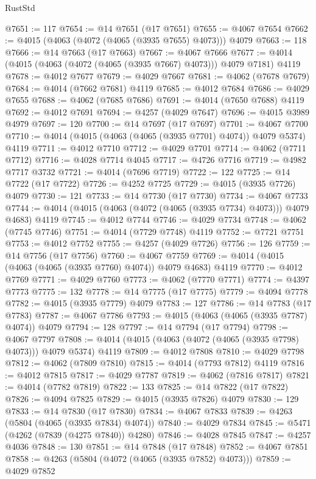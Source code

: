 \begin{lexlean}{RustStd}
\begin{coremodule}
@7651 := 117
@7654 := @14 @7651 (@17 @7651)
@7655 := @4067 @7654
@7662 := @4015 (@4063 (@4072 (@4065 (@3935 @7655) @4073))) @4079
@7663 := 118
@7666 := @14 @7663 (@17 @7663)
@7667 := @4067 @7666
@7677 := @4014 (@4015 (@4063 (@4072 (@4065 (@3935 @7667) @4073))) @4079 @7181) @4119
@7678 := @4012 @7677
@7679 := @4029 @7667
@7681 := @4062 (@7678 @7679)
@7684 := @4014 (@7662 @7681) @4119
@7685 := @4012 @7684
@7686 := @4029 @7655
@7688 := @4062 (@7685 @7686)
@7691 := @4014 (@7650 @7688) @4119
@7692 := @4012 @7691
@7694 := @4257 (@4029 @7647)
@7696 := @4015 @3989 @4979
@7697 := 120
@7700 := @14 @7697 (@17 @7697)
@7701 := @4067 @7700
@7710 := @4014 (@4015 (@4063 (@4065 (@3935 @7701) @4074)) @4079 @5374) @4119
@7711 := @4012 @7710
@7712 := @4029 @7701
@7714 := @4062 (@7711 @7712)
@7716 := @4028 @7714 @4045
@7717 := @4726 @7716
@7719 := @4982 @7717 @3732
@7721 := @4014 (@7696 @7719)
@7722 := 122
@7725 := @14 @7722 (@17 @7722)
@7726 := @4252 @7725
@7729 := @4015 (@3935 @7726) @4079
@7730 := 121
@7733 := @14 @7730 (@17 @7730)
@7734 := @4067 @7733
@7744 := @4014 (@4015 (@4063 (@4072 (@4065 (@3935 @7734) @4073))) @4079 @4683) @4119
@7745 := @4012 @7744
@7746 := @4029 @7734
@7748 := @4062 (@7745 @7746)
@7751 := @4014 (@7729 @7748) @4119
@7752 := @7721 @7751
@7753 := @4012 @7752
@7755 := @4257 (@4029 @7726)
@7756 := 126
@7759 := @14 @7756 (@17 @7756)
@7760 := @4067 @7759
@7769 := @4014 (@4015 (@4063 (@4065 (@3935 @7760) @4074)) @4079 @4683) @4119
@7770 := @4012 @7769
@7771 := @4029 @7760
@7773 := @4062 (@7770 @7771)
@7774 := @4397 @7773
@7775 := 132
@7778 := @14 @7775 (@17 @7775)
@7779 := @4094 @7778
@7782 := @4015 (@3935 @7779) @4079
@7783 := 127
@7786 := @14 @7783 (@17 @7783)
@7787 := @4067 @7786
@7793 := @4015 (@4063 (@4065 (@3935 @7787) @4074)) @4079
@7794 := 128
@7797 := @14 @7794 (@17 @7794)
@7798 := @4067 @7797
@7808 := @4014 (@4015 (@4063 (@4072 (@4065 (@3935 @7798) @4073))) @4079 @5374) @4119
@7809 := @4012 @7808
@7810 := @4029 @7798
@7812 := @4062 (@7809 @7810)
@7815 := @4014 (@7793 @7812) @4119
@7816 := @4012 @7815
@7817 := @4029 @7787
@7819 := @4062 (@7816 @7817)
@7821 := @4014 (@7782 @7819)
@7822 := 133
@7825 := @14 @7822 (@17 @7822)
@7826 := @4094 @7825
@7829 := @4015 (@3935 @7826) @4079
@7830 := 129
@7833 := @14 @7830 (@17 @7830)
@7834 := @4067 @7833
@7839 := @4263 (@5804 (@4065 (@3935 @7834) @4074))
@7840 := @4029 @7834
@7845 := @5471 (@4262 (@7839 (@4275 @7840)) @4280)
@7846 := @4028 @7845
@7847 := @4257 @4036
@7848 := 130
@7851 := @14 @7848 (@17 @7848)
@7852 := @4067 @7851
@7858 := @4263 (@5804 (@4072 (@4065 (@3935 @7852) @4073)))
@7859 := @4029 @7852

\end{coremodule}
\end{lexlean}
